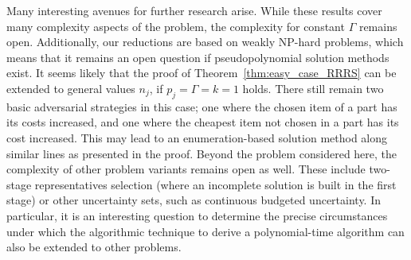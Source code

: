 Many interesting avenues for further research arise. 
While these results cover many complexity aspects of the problem, the complexity for constant $\Gamma$ remains open. Additionally, our reductions are based on weakly NP-hard problems, which means that it remains an open question if pseudopolynomial solution methods exist.
It seems likely that the proof of Theorem~\ref{thm:easy_case_RRRS} can be extended to general values $n_j$, if $p_j=\Gamma = k = 1$ holds. There still remain two basic adversarial strategies in this case; one where the chosen item of a part has its costs increased, and one where the cheapest item not chosen in a part has its cost increased. This may lead to an enumeration-based solution method along similar lines as presented in the proof.
Beyond the problem considered here, the complexity of other problem variants remains open as well. These include two-stage representatives selection (where an incomplete solution is built in the first stage) or other uncertainty sets, such as continuous budgeted uncertainty. In particular, it is an interesting question to determine the precise circumstances under which the algorithmic technique to derive a polynomial-time algorithm can also be extended to other problems.



